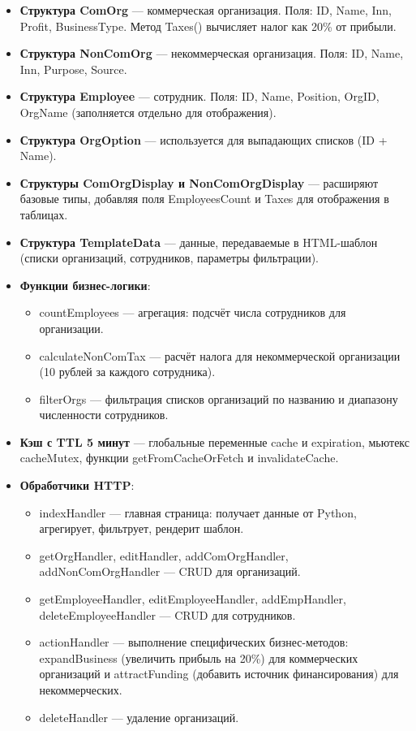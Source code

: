 \documentclass[oneside,a4paper,14pt]{extarticle}
\begin{document}
\begin{itemize}
    \item \textbf{Структура ComOrg} — коммерческая организация. Поля: ID, Name, Inn, Profit, BusinessType. Метод Taxes() вычисляет налог как 20\% от прибыли.
    \item \textbf{Структура NonComOrg} — некоммерческая организация. Поля: ID, Name, Inn, Purpose, Source.
    \item \textbf{Структура Employee} — сотрудник. Поля: ID, Name, Position, OrgID, OrgName (заполняется отдельно для отображения).
    \item \textbf{Структура OrgOption} — используется для выпадающих списков (ID + Name).
    \item \textbf{Структуры ComOrgDisplay и NonComOrgDisplay} — расширяют базовые типы, добавляя поля EmployeesCount и Taxes для отображения в таблицах.
    \item \textbf{Структура TemplateData} — данные, передаваемые в HTML-шаблон (списки организаций, сотрудников, параметры фильтрации).
    \item \textbf{Функции бизнес-логики}:
        \begin{itemize}
            \item countEmployees — агрегация: подсчёт числа сотрудников для организации.
            \item calculateNonComTax — расчёт налога для некоммерческой организации (10 рублей за каждого сотрудника).
            \item filterOrgs — фильтрация списков организаций по названию и диапазону численности сотрудников.
        \end{itemize}
    \item \textbf{Кэш с TTL 5 минут} — глобальные переменные cache и expiration, мьютекс cacheMutex, функции getFromCacheOrFetch и invalidateCache.
    \item \textbf{Обработчики HTTP}:
        \begin{itemize}
            \item indexHandler — главная страница: получает данные от Python, агрегирует, фильтрует, рендерит шаблон.
            \item getOrgHandler, editHandler, addComOrgHandler, addNonComOrgHandler — CRUD для организаций.
            \item getEmployeeHandler, editEmployeeHandler, addEmpHandler, deleteEmployeeHandler — CRUD для сотрудников.
            \item actionHandler — выполнение специфических бизнес-методов: expandBusiness (увеличить прибыль на 20\%) для коммерческих организаций и attractFunding (добавить источник финансирования) для некоммерческих.
            \item deleteHandler — удаление организаций.
        \end{itemize}
\end{itemize}
\end{document}

